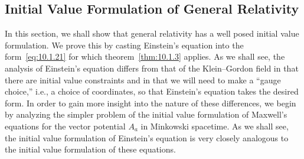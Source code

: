 
\subsection{Initial Value Formulation of General Relativity}\label{sec:10.2}
\setcounter{theorem}{0}

In this section, we shall show that general relativity has a well posed initial value
formulation. We prove this by casting Einstein's equation into the
form~\eqref{eq:10.1.21} for which theorem~\ref{thm:10.1.3} applies. As we shall
see, the analysis of Einstein's equation differs from that of the Klein--Gordon field in
that there are initial value constraints and in that we will need to make a ``gauge
choice,'' i.e., a choice of coordinates, so that Einstein's equation takes the desired
form. In order to gain more insight into the nature of these differences, we begin by
analyzing the simpler problem of the initial value formulation of Maxwell's equations
for the vector potential \(A_a\) in Minkowski spacetime. As we shall see, the initial
value formulation of Einstein's equation is very closely analogous to the initial value
formulation of these equations.

